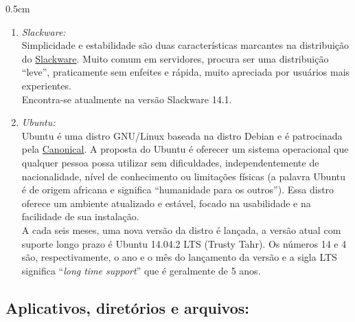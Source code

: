 \begin{refsection}
\begin {myindentpar}{0.5cm}
\begin{enumerate}[\itshape i.]
 \item \textit{Slackware:}\label{tut1:linux:dist:slackware}\\
	Simplicidade e estabilidade são duas características marcantes na distribuição do \href{http://www.slackware.com}{Slackware}. Muito comum em servidores, procura ser uma distribuição ``leve'', praticamente sem enfeites e rápida, muito apreciada por usuários mais experientes.\\
	Encontra-se atualmente na versão Slackware 14.1.\\
 \item \textit{Ubuntu:}\label{tut1:linux:dist:ubuntu}\\
	Ubuntu é uma distro GNU/Linux baseada na distro Debian e é patrocinada pela \href{http://www.ubuntu.com/}{Canonical}. A proposta do Ubuntu é oferecer um sistema operacional que qualquer pessoa possa utilizar sem dificuldades, independentemente de nacionalidade, nível de conhecimento ou limitações físicas (a palavra Ubuntu é de origem africana e significa ``humanidade para os outros''). Essa distro oferece um ambiente atualizado e estável, focado na usabilidade e na facilidade de sua instalação.\\
	A cada seis meses, uma nova versão da distro é lançada, a versão atual com suporte longo prazo é Ubuntu 14.04.2 LTS (Trusty Tahr). Os números 14 e 4 são, respectivamente, o ano e o mês do lançamento da versão e a sigla LTS significa ``\textit{long time support}'' que é geralmente de 5 anos. \\
\end{enumerate}
\end{myindentpar}

\subsection{Aplicativos, diretórios e arquivos:}\label{tut1:linux:struct}


\end{refsection}
